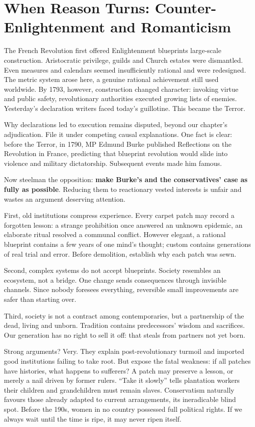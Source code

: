 \section[Reason's Critics]{When Reason Turns: Counter-Enlightenment and Romanticism}
The French Revolution first offered Enlightenment blueprints large-scale construction. Aristocratic privilege, guilds and Church estates were dismantled. Even measures and calendars seemed insufficiently rational and were redesigned. The metric system arose here, a genuine rational achievement still used worldwide. By 1793, however, construction changed character: invoking virtue and public safety, revolutionary authorities executed growing lists of enemies. Yesterday's declaration writers faced today's guillotine. This became the Terror.

Why declarations led to execution remains disputed, beyond our chapter's adjudication. File it under competing causal explanations. One fact is clear: before the Terror, in 1790, MP Edmund Burke published Reflections on the Revolution in France, predicting that blueprint revolution would slide into violence and military dictatorship. Subsequent events made him famous.

Now steelman the opposition: \textbf{make Burke's and the conservatives' case as fully as possible}. Reducing them to reactionary vested interests is unfair and wastes an argument deserving attention.

First, old institutions compress experience. Every carpet patch may record a forgotten lesson: a strange prohibition once answered an unknown epidemic, an elaborate ritual resolved a communal conflict. However elegant, a rational blueprint contains a few years of one mind's thought; custom contains generations of real trial and error. Before demolition, establish why each patch was sewn.

Second, complex systems do not accept blueprints. Society resembles an ecosystem, not a bridge. One change sends consequences through invisible channels. Since nobody foresees everything, reversible small improvements are safer than starting over.

Third, society is not a contract among contemporaries, but a partnership of the dead, living and unborn. Tradition contains predecessors' wisdom and sacrifices. Our generation has no right to sell it off: that steals from partners not yet born.

Strong arguments? Very. They explain post-revolutionary turmoil and imported good institutions failing to take root. But expose the fatal weakness: if all patches have histories, what happens to sufferers? A patch may preserve a lesson, or merely a nail driven by former rulers. ``Take it slowly'' tells plantation workers their children and grandchildren must remain slaves. Conservatism naturally favours those already adapted to current arrangements, its ineradicable blind spot. Before the 190s, women in no country possessed full political rights. If we always wait until the time is ripe, it may never ripen itself.

